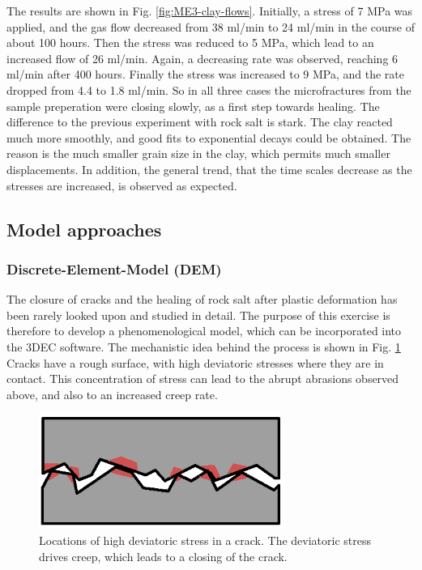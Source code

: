 The results are shown in Fig. \ref{fig:ME3-clay-flows}. Initially, a stress of 7 MPa was applied, and the gas flow decreased from 38 ml/min to 24 ml/min in the course of about 100 hours. Then the stress was reduced to 5 MPa, which lead to an increased flow of 26 ml/min. Again, a decreasing rate was observed, reaching 6 ml/min after 400 hours. Finally the stress was increased to 9 MPa, and the rate dropped from 4.4 to 1.8 ml/min. So in all three cases the microfractures from the sample preperation were closing slowly, as a first step towards healing. The difference to the previous experiment with rock salt is stark. The clay reacted much more smoothly, and good fits to exponential decays could be obtained. The reason is the much smaller grain size in the clay, which permits much smaller displacements. In addition, the general trend, that the time scales decrease as the stresses are increased, is observed as expected. 

\subsection{Model approaches}
\subsubsection*{Discrete-Element-Model (DEM)}

The closure of cracks and the healing of rock salt after plastic deformation has been rarely looked upon and studied in detail. The purpose of this exercise is therefore to develop a phenomenological model, which can be incorporated into the 3DEC software. The mechanistic idea behind the process is shown in Fig. \ref{fig:ME3-crack-stre} Cracks have a rough surface, with high deviatoric stresses where they are in contact. This concentration of stress can lead to the abrupt abrasions observed above, and also to an increased creep rate. 

\begin{figure}[!ht]
\centering
\includegraphics[width=8cm]{figures/mex3-crack-stresses.png}
\caption{Locations of high deviatoric stress in a crack. The deviatoric stress drives creep, which leads to a closing of the crack.}
\label{fig:ME3-crack-stre}
\end{figure}

